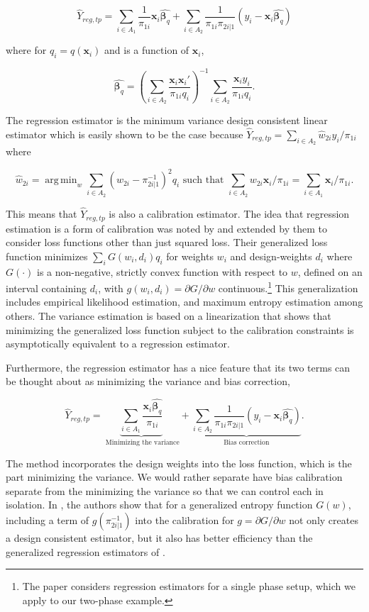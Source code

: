 \documentclass[12pt]{article}
\DeclareMathOperator*{\argmin}{arg\,min}
\renewcommand{\bf}[1]{\mathbf{#1}}
\begin{document}
$$ 
\hat Y_{reg, tp} 
= \sum_{i \in A_1} \frac{1}{\pi_{1i}} \bf x_i \hat{\bm \beta_q} + 
\sum_{i \in A_2} \frac{1}{\pi_{1i}\pi_{2i|1}} (y_i - \bf x_i \hat{\bm \beta_q})
$$

where for $q_i = q(\bf x_i)$ and is a function of $\bf x_i$,

$$
\hat{\bm \beta_q} = \left(\sum_{i \in A_2} 
  \frac{\bf x_i \bf x_i'}{\pi_{1i} q_i}\right)^{-1} 
\sum_{i \in A_2} \frac{\bf x_i y_i}{\pi_{1i} q_i}.
$$ 

The regression estimator is the minimum variance design consistent linear
estimator which is easily shown to be the case because $\hat Y_{reg, tp} =
\sum_{i \in A_2} \hat w_{2i} y_i / \pi_{1i}$ where 

$$
\hat w_{2i} = \argmin_{w} \sum_{i \in A_2} (w_{2i} - \pi_{2i|1}^{-1})^2 q_i
\text{ such that } \sum_{i \in A_2} w_{2i} \bf x_i / \pi_{1i} = \sum_{i \in A_1}
\bf x_i / \pi_{1i}.
$$

This means that $\hat Y_{reg, tp}$ is also a calibration estimator. The idea
that regression estimation is a form of calibration was noted by
\cite{deville1992calibration} and extended by them to consider loss functions
other than just squared loss. Their generalized loss function minimizes
$\sum_i G(w_i, d_i)q_i$ for weights $w_i$ and design-weights $d_i$ where
$G(\cdot)$ is a non-negative, strictly convex function with respect to $w$,
defined on an interval containing $d_i$, with $g(w_i, d_i) = \partial G /
\partial w$ continuous.\footnote{The \cite{deville1992calibration} paper
considers regression estimators for a single phase setup, which we apply to our
two-phase example.} This
generalization includes empirical likelihood estimation, and maximum entropy
estimation among others. The variance estimation is based on a linearization
that shows that minimizing the generalized loss function subject to the
calibration constraints is asymptotically equivalent to a regression estimator.

Furthermore, the regression estimator
has a nice feature that its two terms can be thought about as minimizing the
variance and bias correction,

$$ 
\hat Y_{reg, tp} 
= \underbrace{\sum_{i \in A_1} \frac{\bf x_i \hat{\bm \beta_q}}{\pi_{1i}}}_{
  \text{ Minimizing the variance}} + \underbrace{\sum_{i \in A_2}
\frac{1}{\pi_{1i}\pi_{2i|1}} (y_i - \bf x_i \hat{\bm \beta_q})}_{
\text{Bias correction}}.
$$

The \cite{deville1992calibration} method incorporates the design weights into
the loss function, which is the part minimizing the variance. We would rather
separate have bias calibration separate from the minimizing the variance so that
we can control each in isolation. In
\cite{kwon2024debiased}, the authors show that for a generalized entropy
function $G(w)$, including a term of $g(\pi_{2i|1}^{-1})$ into the calibration
for $g = \partial G / \partial w$ not only creates a design consistent
estimator, but it also has better efficiency than the generalized regression
estimators of \cite{deville1992calibration}.
\end{document}
